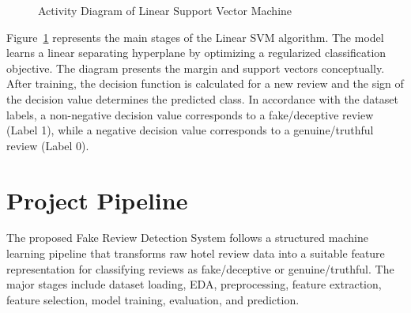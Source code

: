 \documentclass[12pt,a4paper]{report}
\begin{document}
\begin{figure}[H]

\caption{Activity Diagram of Linear Support Vector Machine}
\label{fig:svm_activity}
\end{figure}

Figure~\ref{fig:svm_activity} represents the main stages of the Linear SVM algorithm. The model learns a linear separating hyperplane by optimizing a regularized classification objective. The diagram presents the margin and support vectors conceptually. After training, the decision function is calculated for a new review and the sign of the decision value determines the predicted class. In accordance with the dataset labels, a non-negative decision value corresponds to a fake/deceptive review (Label 1), while a negative decision value corresponds to a genuine/truthful review (Label 0).

\section{Project Pipeline}

The proposed Fake Review Detection System follows a structured machine learning pipeline that transforms raw hotel review data into a suitable feature representation for classifying reviews as fake/deceptive or genuine/truthful. The major stages include dataset loading, EDA, preprocessing, feature extraction, feature selection, model training, evaluation, and prediction.
\end{document}
